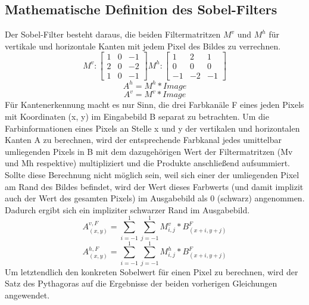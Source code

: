 \documentclass[course=erap]{aspdoc}
\begin{document}
\subsection{Mathematische Definition des Sobel-Filters}
\label{subsec:math-def}
Der Sobel-Filter besteht daraus, die beiden Filtermatritzen $M^{v}$ und $M^{h}$ für vertikale und horizontale Kanten mit jedem Pixel des Bildes zu verrechnen.
\begin{equation}
    M^{v} :
    \begin{bmatrix}
        1 & 0 & -1 \\
        2 & 0 & -2 \\
        1 & 0 & -1
    \end{bmatrix}
    M^{h} :
    \begin{bmatrix}
        1 & 2 & 1 \\
        0 & 0 & 0 \\
        -1 & -2 & -1
    \end{bmatrix}\label{eq:mvmh}
\end{equation}
\begin{equation}
    A^{h} = M^{h} * Image\label{eq:faltenhorizontal}
\end{equation}
\begin{equation}
    A^{v} = M^{v} * Image\label{eq:faltenvertikal}
\end{equation}
Für Kantenerkennung macht es nur Sinn, die drei Farbkanäle F eines jeden Pixels mit Koordinaten (x, y) im Eingabebild B separat zu betrachten.
Um die Farbinformationen eines Pixels an Stelle x und y der vertikalen und horizontalen Kanten A zu berechnen, wird der entsprechende Farbkanal jedes umittelbar umliegenden Pixels in B mit dem dazugehörigen Wert der Filtermatritzen (Mv und Mh respektive) multipliziert und die Produkte anschließend aufsummiert.
Sollte diese Berechnung nicht möglich sein, weil sich einer der umliegenden Pixel am Rand des Bildes befindet, wird der Wert dieses Farbwerts (und damit implizit auch der Wert des gesamten Pixels) im Ausgabebild als 0 (schwarz) angenommen.
Dadurch ergibt sich ein impliziter schwarzer Rand im Ausgabebild.
\begin{equation}
    A_(x,y)^{v,F} = \sum_{i=-1}^{1} \sum_{j=-1}^{1} M^{v}_{i,j} * B_{(x+i,y+j)}^{F}\label{eq:sumav}
\end{equation}
\begin{equation}
    A_(x,y)^{h,F} = \sum_{i=-1}^{1} \sum_{j=-1}^{1} M^{h}_{i,j} * B_{(x+i,y+j)}^{F}\label{eq:sumah}
\end{equation}
Um letztendlich den konkreten Sobelwert für einen Pixel zu berechnen, wird der Satz des Pythagoras auf die Ergebnisse der beiden vorherigen Gleichungen angewendet.
\end{document}
